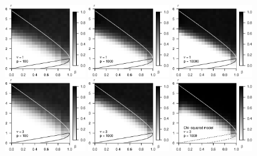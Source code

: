 \begin{figure}
      \centering
      \includegraphics[width=0.32\textwidth]{./simulated_phase_diagram_chi-squared_nu1_p100.eps}
      \includegraphics[width=0.32\textwidth]{./simulated_phase_diagram_chi-squared_nu1_p1000.eps}
      \includegraphics[width=0.32\textwidth]{./simulated_phase_diagram_chi-squared_nu1_p10000.eps}
      \includegraphics[width=0.32\textwidth]{./simulated_phase_diagram_chi-squared_nu3_p100.eps}
      \includegraphics[width=0.32\textwidth]{./simulated_phase_diagram_chi-squared_nu3_p1000.eps}
      \includegraphics[width=0.32\textwidth]{./simulated_phase_diagram_chi-squared_nu3_p10000.eps}

\end{figure}
